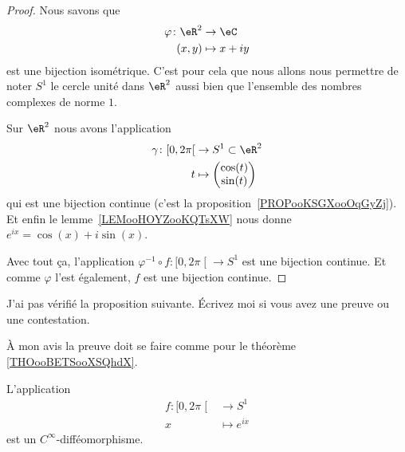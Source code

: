 \begin{proof}
	Nous savons que
	\begin{equation}
		\begin{aligned}
			\varphi\colon \eR^2 & \to \eC      \\
			(x,y)               & \mapsto x+iy
		\end{aligned}
	\end{equation}
	est une bijection isométrique. C'est pour cela que nous allons nous permettre de noter \( S^1\) le cercle unité dans \( \eR^2\) aussi bien que l'ensemble des nombres complexes de norme \( 1\).

	Sur \( \eR^2\) nous avons l'application
	\begin{equation}
		\begin{aligned}
			\gamma\colon \mathopen[ 0 , 2\pi \mathclose[ & \to S^1\subset \eR^2   \\
			t                                            & \mapsto \begin{pmatrix}
				                                                       \cos(t) \\
				                                                       \sin(t)
			                                                       \end{pmatrix}
		\end{aligned}
	\end{equation}
	qui est une bijection continue (c'est la proposition~\ref{PROPooKSGXooOqGyZj}). Et enfin le lemme~\ref{LEMooHOYZooKQTsXW} nous donne \(  e^{ix}=\cos(x)+i\sin(x)\).

	Avec tout ça, l'application \( \varphi^{-1}\circ f\colon \mathopen[ 0 , 2\pi \mathclose[\to S^1 \) est une bijection continue. Et comme \( \varphi\) l'est également, \( f\) est une bijection continue.
\end{proof}


\begin{probleme}
	J'ai pas vérifié la proposition suivante. Écrivez moi si vous avez une preuve ou une contestation.

	À mon avis la preuve doit se faire comme pour le théorème \ref{THOooBETSooXSQhdX}.
\end{probleme}

\begin{proposition}		\label{PROPooXELTooYKjDav}
	L'application
	\begin{equation}
		\begin{aligned}
			f\colon \mathopen[ 0 , 2\pi \mathclose[ & \to S^1         \\
			x                                       & \mapsto  e^{ix}
		\end{aligned}
	\end{equation}
	est un \( C^{\infty}\)-difféomorphisme.
\end{proposition}


